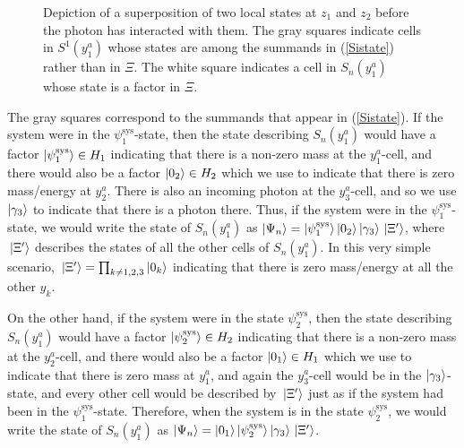 \begin{figure}[ht!]

\vspace*{2px}
\caption{Depiction of a superposition of two local states at $z_1$ and $z_2$ before the photon has interacted with them. The gray squares indicate cells in $S^1(y^a_1)$ whose states are among the summands in (\ref{Sistate}) rather than in $\Xi$. The white square indicates a cell in $S_n(y^a_1)$ whose state is a factor in $\Xi$.}
\label{kentdeco1}
\end{figure}

The gray squares correspond to the summands that appear in (\ref{Sistate}). If the system were in the $\psi_1^\text{sys}$-state, then the state describing $S_n(y^a_1)$ would have a factor $\ket{\psi_1^\text{sys}}\in H_1$ indicating that there is a 
non-zero mass at the $y^a_1$-cell, and there would also be a factor $\ket{0_2}\in H_2$ which we use to indicate that there is zero mass/energy at $y^a_2$. 
There is also an incoming photon at the $y^a_3$-cell, and so we use $\ket{\gamma_3}$ to indicate that there is a photon there.
 Thus, if  the system  were in the $\psi_1^\text{sys}$-state, we would write the state of $S_n(y^a_1)$ 
 as $\ket{\Psi_n}=\ket{\psi_1^\text{sys}}\ket{0_2}\ket{\gamma_3}\ket*{\Xi'}$, where $\ket*{\Xi'}$ describes the states of all the other cells of $S_n(y^a_1)$. In this very simple scenario, $\ket*{\Xi'}=\prod_{k\neq 1,2,3}\ket{0_k}$ indicating that there is zero mass/energy at all the other $y_k$.

 On the other hand, if the system were in the state $\psi_2^\text{sys}$, then the state describing $S_n(y^a_1)$ would have a factor $\ket{\psi_2^\text{sys}}\in H_2$ 
 indicating that there is a non-zero mass at the $y^a_2$-cell, and there would also be a factor $\ket{0_1}\in H_1$ which we use to indicate that there is zero mass at $y^a_1$,
  and again the $y^a_3$-cell would be in the $\ket{\gamma_3}$-state, and every other cell would be described by  $\ket*{\Xi'}$  just as if the system had been in the $\psi_1^\text{sys}$-state. Therefore, when the system is in the state $\psi_2^\text{sys}$, we would write the state of $S_n(y^a_1)$ as $\ket{\Psi_n}=\ket{0_1}\ket{\psi_2^\text{sys}}\ket{\gamma_3}\ket*{\Xi'}$. 
 
